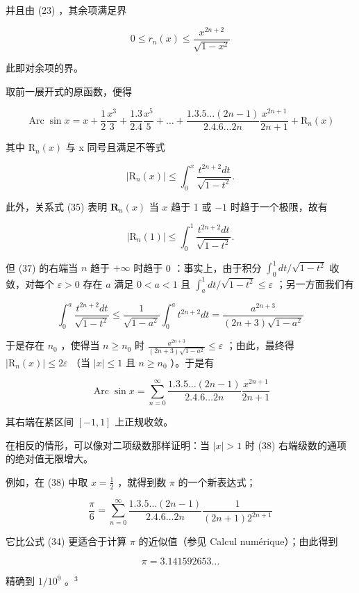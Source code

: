 并且由 (23) ，其余项满足界

\[
0 \leqslant r _ {n} (x) \leqslant \frac {x ^ {2 n + 2}}{\sqrt {1 - x ^ {2}}}
\]

此即对余项的界。

取前一展开式的原函数，便得

\[
\operatorname{Arc} \sin x = x + \frac {1}{2} \frac {x ^ {3}}{3} + \frac {1 . 3}{2 . 4} \frac {x ^ {5}}{5} + \dots + \frac {1 . 3 . 5 \dots (2 n - 1)}{2 . 4 . 6 \dots 2 n} \frac {x ^ {2 n + 1}}{2 n + 1} + \mathrm{R} _ {n} (x)\tag{35}
\]

其中 \(\mathrm{R}_{n}(x)\) 与 x 同号且满足不等式

\[
| \mathrm{R} _ {n} (x) | \leqslant \int_ {0} ^ {x} \frac {t ^ {2 n + 2} d t}{\sqrt {1 - t ^ {2}}}.\tag{36}
\]

此外，关系式 (35) 表明 \(\mathbf{R}_n(x)\) 当 \(x\) 趋于 1 或 \(-1\) 时趋于一个极限，故有

\[
| \mathrm{R} _ {n} (1) | \leqslant \int_ {0} ^ {1} \frac {t ^ {2 n + 2} d t}{\sqrt {1 - t ^ {2}}}.\tag{37}
\]

但 (37) 的右端当 \(n\) 趋于 \(+\infty\) 时趋于 0 ：事实上，由于积分 \(\int_0^1 dt / \sqrt{1 - t^2}\) 收敛，对每个 \(\varepsilon > 0\) 存在 \(a\) 满足 \(0 < a < 1\) 且 \(\int_a^1 dt / \sqrt{1 - t^2} \leqslant \varepsilon\) ；另一方面我们有

\[
\int_ {0} ^ {a} \frac {t ^ {2 n + 2} d t}{\sqrt {1 - t ^ {2}}} \leqslant \frac {1}{\sqrt {1 - a ^ {2}}} \int_ {0} ^ {a} t ^ {2 n + 2} d t = \frac {a ^ {2 n + 3}}{(2 n + 3) \sqrt {1 - a ^ {2}}}
\]

于是存在 \(n_0\) ，使得当 \(n \geqslant n_0\) 时 \(\frac{a^{2n+3}}{(2n+3)\sqrt{1-a^2}} \leqslant \varepsilon\) ；由此，最终得 \(|\mathrm{R}_n(x)| \leqslant 2\varepsilon\) （当 \(|x| \leqslant 1\) 且 \(n \geqslant n_0\) ）。于是有

\[
\operatorname{Arc} \sin x = \sum_ {n = 0} ^ {\infty} \frac {1 . 3 . 5 \dots (2 n - 1)}{2 . 4 . 6 \dots 2 n} \frac {x ^ {2 n + 1}}{2 n + 1}\tag{38}
\]

其右端在紧区间 \([-1, 1]\) 上正规收敛。

在相反的情形，可以像对二项级数那样证明：当 \(|x| > 1\) 时 (38) 右端级数的通项的绝对值无限增大。

例如，在 (38) 中取 \(x = \frac{1}{2}\) ，就得到数 \(\pi\) 的一个新表达式；

\[
\frac {\pi}{6} = \sum_ {n = 0} ^ {\infty} \frac {1 . 3 . 5 \dots (2 n - 1)}{2 . 4 . 6 \dots 2 n} \frac {1}{(2 n + 1) 2 ^ {2 n + 1}}
\]

它比公式 (34) 更适合于计算 \(\pi\) 的近似值（参见 Calcul numérique）；由此得到

\[
\pi = 3. 1 4 1   5 9 2   6 5 3 \dots
\]

精确到 \(1/10^{9}\) 。\(^{3}\)
